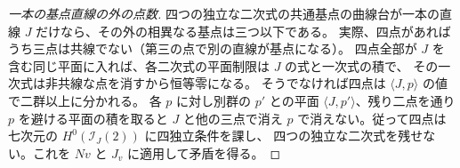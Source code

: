\begin{proof}[一本の基点直線の外の点数]
四つの独立な二次式の共通基点の曲線台が一本の直線 $J$ だけなら、その外の相異なる基点は三つ以下である。
実際、四点があればうち三点は共線でない（第三の点で別の直線が基点になる）。
四点全部が $J$ を含む同じ平面に入れば、各二次式の平面制限は $J$ の式と一次式の積で、
その一次式は非共線な点を消すから恒等零になる。
そうでなければ四点は $\langle J,p\rangle$ の値で二群以上に分かれる。
各 $p$ に対し別群の $p'$ との平面 $\langle J,p'\rangle$、残り二点を通り $p$ を避ける平面の積を取ると
$J$ と他の三点で消え $p$ で消えない。従って四点は七次元の $H^0(\mathcal I_J(2))$ に四独立条件を課し、
四つの独立な二次式を残せない。これを $Nv$ と $J_v$ に適用して矛盾を得る。
\end{proof}
